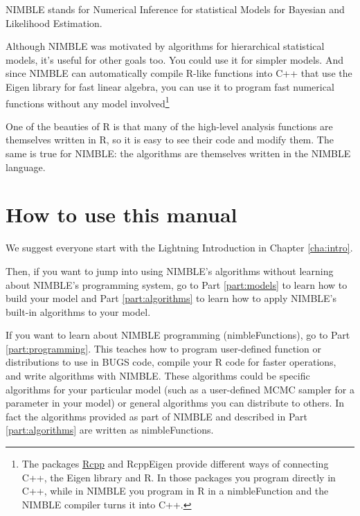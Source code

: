 \documentclass[12pt,oneside]{book}\usepackage[]{graphicx}\usepackage[]{color}
\begin{document}
NIMBLE stands for Numerical Inference for statistical Models for
Bayesian and Likelihood Estimation.  

Although NIMBLE was motivated by algorithms for hierarchical
statistical models, it's useful for other goals too.  You could use it
for simpler models.  And since NIMBLE can automatically compile R-like
functions into C++ that use the Eigen library for fast linear algebra,
you can use it to program fast numerical functions without any model
involved\footnote{The packages \href{http://www.rcpp.org/}{Rcpp} and
  RcppEigen provide different ways of connecting C++, the Eigen
  library and R.  In those packages you program directly in C++, while
  in NIMBLE you program in R in a nimbleFunction and the NIMBLE compiler
  turns it into C++.}

One of the beauties of R is that many of the high-level analysis
functions are themselves written in R, so it is easy to see their code and modify
them.  The same is true for NIMBLE: the algorithms are themselves
written in the NIMBLE language.

\section{How to use this manual}

We suggest everyone start with the Lightning Introduction in Chapter \ref{cha:intro}.

Then, if you want to jump into using NIMBLE's algorithms without learning
about NIMBLE's programming system, go to Part \ref{part:models} to
learn how to build your model and Part \ref{part:algorithms} to learn
how to apply NIMBLE's built-in algorithms to your model.

If you want to learn about NIMBLE programming (nimbleFunctions), go to Part
\ref{part:programming}. This teaches how to program user-defined
function or distributions to use in BUGS code, compile your R code for
faster operations, and write algorithms with NIMBLE. These algorithms
could be specific algorithms for your particular model (such as a
user-defined MCMC sampler for a parameter in your model) or general
algorithms you can distribute to others. In fact the algorithms
provided as part of NIMBLE and described in Part \ref{part:algorithms}
are written as nimbleFunctions.


\end{document}

